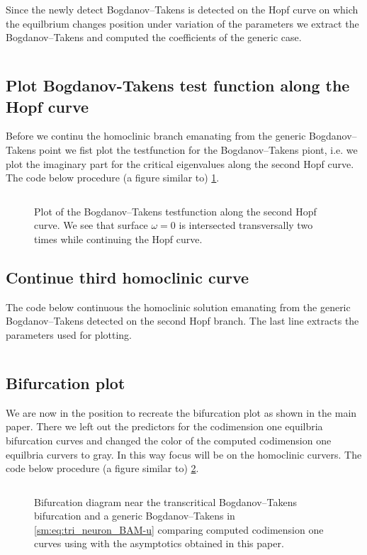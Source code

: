 Since the newly detect Bogdanov--Takens is detected on the Hopf curve
on which the equilbrium changes position under variation of the
parameters we extract the Bogdanov--Takens and computed the coefficients
of the generic case.
\inputminted[firstline=179, lastline=181]{MATLAB}{\pathToDDEBifToolDemos/BAM_neural_network_model/BAMnn.m}

\subsection{Plot Bogdanov-Takens test function along the Hopf curve}
Before we continu the homoclinic branch emanating from the generic
Bogdanov--Takens point we fist plot the testfunction for the Bogdanov--Takens
piont, i.e. we plot the imaginary part for the critical eigenvalues along the
second Hopf curve. The code below procedure (a figure similar to)
\cref{sm:fig:triNeuronBAMNeuralNetworkModelTestfunction}.
\inputminted[firstline=185, lastline=197]{MATLAB}{\pathToDDEBifToolDemos/BAM_neural_network_model/BAMnn.m}
%
\begin{figure}[ht]
    \centering
    \caption{Plot of the Bogdanov--Takens testfunction along the second Hopf curve. 
    We see that surface $\omega=0$ is intersected transversally two times
    while continuing the Hopf curve.}
    \label{sm:fig:triNeuronBAMNeuralNetworkModelTestfunction}
\end{figure}

\subsection{Continue third homoclinic curve}
The code below continuous the homoclinic solution emanating from the generic Bogdanov--Takens detected
on the second Hopf branch. The last line extracts the parameters used for plotting.
\inputminted[firstline=199, lastline=205]{MATLAB}{\pathToDDEBifToolDemos/BAM_neural_network_model/BAMnn.m}

\subsection{Bifurcation plot}
We are now in the position to recreate the bifurcation plot as shown in the main paper. There we
left out the predictors for the codimension one equilbria bifurcation curves and changed the color
of the computed codimension one equilbria curvers to gray. In this way focus will be on
the homoclinic curvers. The code below procedure (a figure similar to)
\cref{sm:fig:triNeuronBAMNeuralNetworkModelCompareParameters}.
\inputminted[firstline=213, lastline=243]{MATLAB}{\pathToDDEBifToolDemos/BAM_neural_network_model/BAMnn.m}
\begin{figure}[ht]
    \caption{
    Bifurcation diagram near the transcritical Bogdanov--Takens bifurcation and
    a generic Bogdanov--Takens in \cref{sm:eq:tri_neuron_BAM-u} comparing computed
    codimension one curves using \DDEBIFTOOL with the asymptotics obtained in this
    paper.}
    \label{sm:fig:triNeuronBAMNeuralNetworkModelCompareParameters}
\end{figure}

